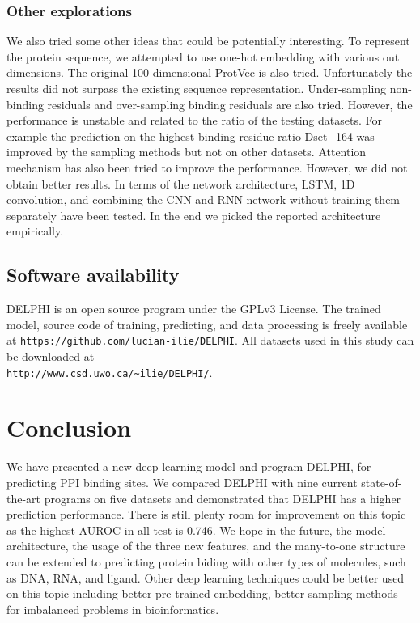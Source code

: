 \documentclass{bioinfo}
\begin{document}
\subsubsection{Other explorations}
We also tried some other ideas that could be potentially interesting. To represent the protein sequence, we attempted to use one-hot embedding with various out dimensions. The original 100 dimensional ProtVec is also tried. Unfortunately the results did not surpass the existing sequence representation. Under-sampling non-binding residuals and over-sampling binding residuals are also tried. However, the performance is unstable and related to the ratio of the testing datasets. For example the prediction on the highest binding residue ratio Dset\_164 was improved by the sampling methods but not on other datasets. Attention mechanism has also been tried to improve the performance. However, we did not obtain better results. In terms of the network architecture, LSTM, 1D convolution, and combining the CNN and RNN network without training them separately have been tested. In the end we picked the reported architecture empirically. 

\subsection{Software availability}
DELPHI is an open source program under the GPLv3 License. The trained model, source code of training, predicting, and data processing is freely available at \texttt{https://github.com/lucian-ilie/DELPHI}. 
All datasets used in this study can be downloaded at\\
\texttt{http://www.csd.uwo.ca/\~{}ilie/DELPHI/}.\\

\section{Conclusion}
We have presented a new deep learning model and program DELPHI, for predicting PPI binding sites. We compared DELPHI with nine current state-of-the-art programs on five datasets and demonstrated that DELPHI has a higher prediction performance. There is still plenty room for improvement on this topic as the highest AUROC in all test is 0.746. 
We hope in the future, the model architecture, the usage of the three new features, and the many-to-one structure can be extended to predicting protein biding with other types of molecules, such as DNA, RNA, and ligand. Other deep learning techniques could be better used on this topic including better pre-trained embedding, better sampling methods for imbalanced problems in bioinformatics. 
\end{document}

